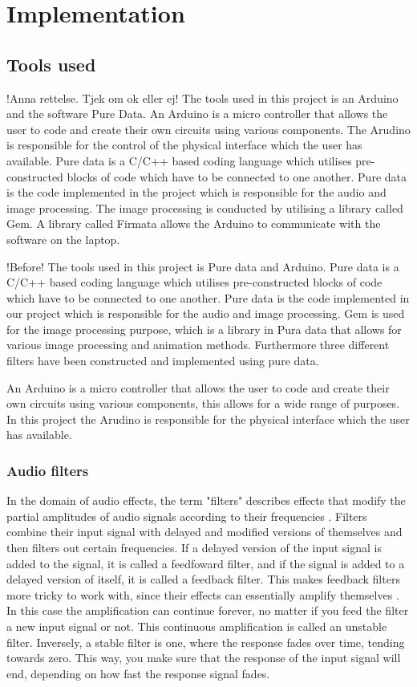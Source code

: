 \chapter{Implementation}\label{ch:implementation}

\section{Tools used}\label{sec:toolsused}
!Anna rettelse. Tjek om ok eller ej!
The tools used in this project is an Arduino and the software Pure Data. 
An Arduino is a micro controller that allows the user to code and create their own circuits using various components. The Arudino is responsible for the control of the physical interface which the user has available.
Pure data is a C/C++ based coding language which utilises pre-constructed blocks of code which have to be connected to one another. Pure data is the code implemented in the project which is responsible for the audio and image processing. The image processing is conducted by utilising a library called Gem. 
A library called Firmata allows the Arduino to communicate with the software on the laptop.


!Before!
The tools used in this project is Pure data and Arduino. 
Pure data is a C/C++ based coding language which utilises pre-constructed blocks of code which have to be connected to one another. Pure data is the code implemented in our project which is responsible for the audio and image processing. Gem is used for the image processing purpose, which is a library in Pura data that allows for various image processing and animation methods.  
Furthermore three different filters have been constructed and implemented using pure data.

An Arduino is a micro controller that allows the user to code and create their own circuits using various components, this allows for a wide range of purposes. In this project the Arudino is responsible for the physical interface which the user has available. 

\subsection{Audio filters}
In the domain of audio effects, the term "filters" describes effects that modify the partial amplitudes of audio signals according to their frequencies \cite{zolzer2011dafx}. Filters combine their input signal with delayed and modified versions of themselves and then filters out certain frequencies. If a delayed version of the input signal is added to the signal, it is called a feedfoward filter, and if the signal is added to a delayed version of itself, it is called a feedback filter. This makes feedback filters more tricky to work with, since their effects can essentially amplify themselves \cite{steiglitz1997digital}. In this case the amplification can continue forever, no matter if you feed the filter a new input signal or not. This continuous amplification is called an unstable filter. Inversely, a stable filter is one, where the response fades over time, tending towards zero. This way, you make sure that the response of the input signal will end, depending on how fast the response signal fades.


